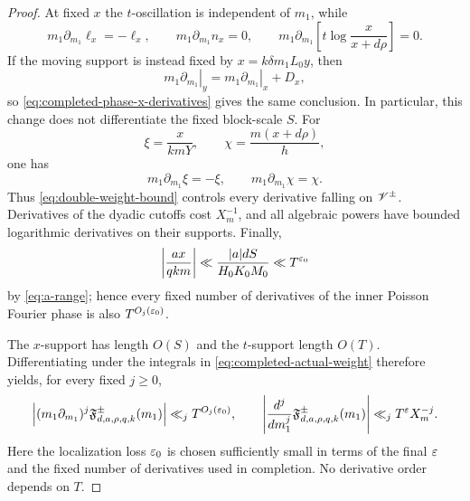 \begin{proof}
At fixed $x$ the $t$-oscillation is independent of $m_1$, while
\begin{equation}\label{eq:completed-variable-derivatives}
 m_1\partial_{m_1}\ell_x=-\ell_x,\qquad
 m_1\partial_{m_1}n_x=0,\qquad
 m_1\partial_{m_1}\left[t\log\frac{x}{x+d\rho}\right]=0.
\end{equation}
If the moving support is instead fixed by $x=k\delta m_1L_0y$, then
\[
 \left.m_1\partial_{m_1}\right|_y
 =\left.m_1\partial_{m_1}\right|_x+D_x,
\]
so \eqref{eq:completed-phase-x-derivatives} gives the same conclusion.
In particular, this change does not differentiate the fixed block-scale
$S$.  For
\[
 \xi=\frac{x}{kmY},\qquad \chi=\frac{m(x+d\rho)}h,
\]
one has
\begin{equation}\label{eq:completed-kernel-derivatives}
 m_1\partial_{m_1}\xi=-\xi,\qquad
 m_1\partial_{m_1}\chi=\chi.
\end{equation}
Thus \eqref{eq:double-weight-bound} controls every derivative falling on
$\mathscr V^\pm$.  Derivatives of the dyadic cutoffs cost $X_m^{-1}$, and all
algebraic powers have bounded logarithmic derivatives on their supports.
Finally,
\begin{equation}\label{eq:completed-inner-phase-bound}
 \left|\frac{ax}{qkm}\right|
 \ll \frac{|a|dS}{H_0K_0M_0}
 \ll T^{\varepsilon_0}
\end{equation}
by \eqref{eq:a-range}; hence every fixed number of derivatives of the inner
Poisson Fourier phase is also $T^{O_j(\varepsilon_0)}$.

The $x$-support has length $O(S)$ and the $t$-support length $O(T)$.
Differentiating under the integrals in
\eqref{eq:completed-actual-weight} therefore yields, for every fixed
$j\geq0$,
\begin{equation}\label{eq:completed-weight-derivatives}
 \left|(m_1\partial_{m_1})^j
 \mathfrak F_{d,a,\rho,q,k}^{\pm}(m_1)\right|
 \ll_jT^{O_j(\varepsilon_0)},
 \qquad
 \left|\frac{d^j}{dm_1^j}\mathfrak F_{d,a,\rho,q,k}^{\pm}(m_1)\right|
 \ll_jT^\varepsilon X_m^{-j}.
\end{equation}
Here the localization loss $\varepsilon_0$ is chosen sufficiently small in terms
of the final $\varepsilon$ and the fixed number of derivatives used in completion.
No derivative order depends on $T$.


\end{proof}
